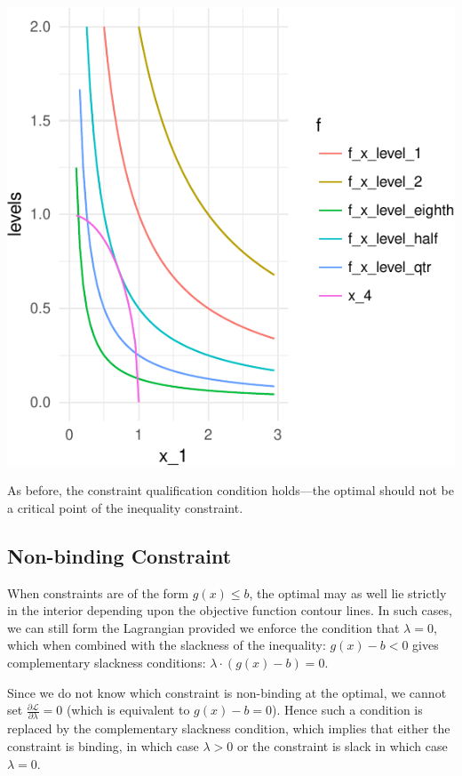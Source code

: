 \documentclass[11pt,]{article}
\begin{document}
\includegraphics{Optimization_2_files/figure-latex/opt_dim_2_ineq-1.pdf}

As before, the constraint qualification condition holds---the optimal
should not be a critical point of the inequality constraint.

\subsection{Non-binding Constraint}\label{non-binding-constraint}

When constraints are of the form \(g(x)\leq b\), the optimal may as well
lie strictly in the interior depending upon the objective function
contour lines. In such cases, we can still form the Lagrangian provided
we enforce the condition that \(\lambda=0\), which when combined with
the slackness of the inequality: \(g(x)-b<0\) gives complementary
slackness conditions: \(\lambda\cdot (g(x)-b)=0\).

Since we do not know which constraint is non-binding at the optimal, we
cannot set \(\frac{\partial \mathcal{L}}{\partial \lambda}=0\) (which is
equivalent to \(g(x)-b=0\)). Hence such a condition is replaced by the
complementary slackness condition, which implies that either the
constraint is binding, in which case \(\lambda>0\) or the constraint is
slack in which case \(\lambda = 0\).
\end{document}
